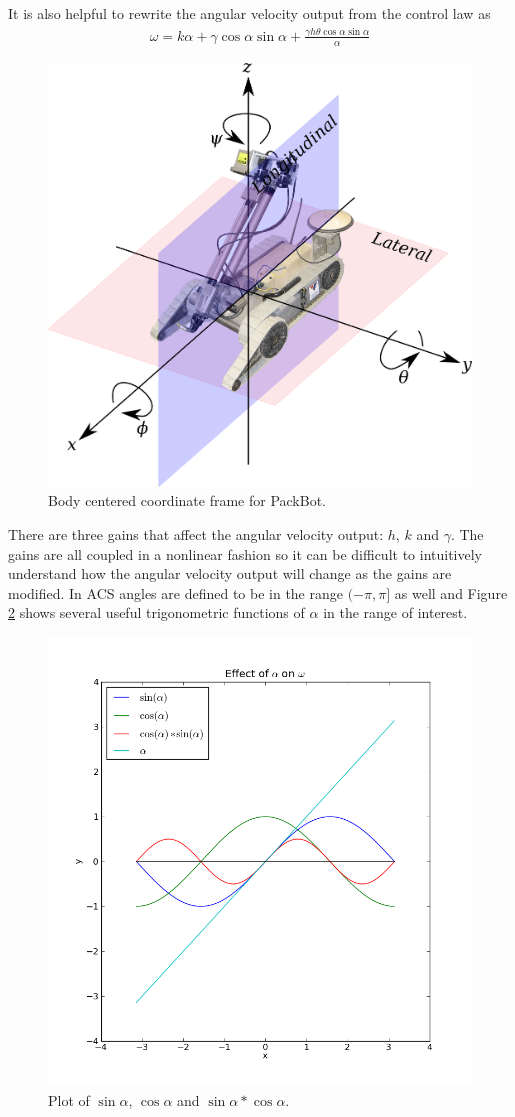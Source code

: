 \documentclass[12pt]{article}
\begin{document}
It is also helpful to rewrite the angular velocity output from the control law as
\begin{align*}
\omega = k\alpha + \gamma\cos\alpha\sin\alpha + \frac{\gamma h\theta\cos\alpha\sin\alpha}{\alpha}
\end{align*}

\begin{figure}[ht!]
	\centering
	\includegraphics[width=.5\textwidth]{images/packbotaxes}
	\caption{Body centered coordinate frame for PackBot.}
	\label{fig:packbotaxes}
\end{figure}

There are three gains that affect the angular velocity output: $h$, $k$ and $\gamma$. The gains are all coupled in a nonlinear fashion so it can be difficult to intuitively understand how the angular velocity output will change as the gains are modified. In ACS angles are defined to be in the range $(-\pi,\pi]$ as well and Figure \ref{fig:plotSinCos} shows several useful trigonometric functions of $\alpha$ in the range of interest.

\begin{figure}[ht!]
	\centering
	\includegraphics[width=.75\textwidth]{images/plotSinCos}
	\caption{Plot of $\sin\alpha$, $\cos\alpha$ and $\sin\alpha*\cos\alpha$.}
	\label{fig:plotSinCos}
\end{figure}
\end{document}
